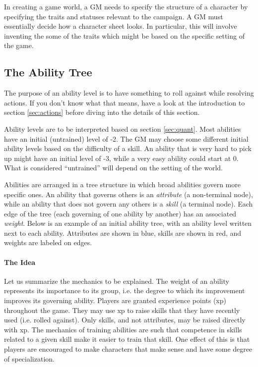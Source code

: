 \documentclass[12pt]{article}
\begin{document}
In creating a game world, a GM needs to specify the structure of a character by specifying the traits and statuses relevant to the campaign.
A GM must essentially decide how a character sheet looks.
In particular, this will involve inventing the some of the traits which might be based on the specific setting of the game.

\subsection{The Ability Tree}\label{sec:tree}			

The purpose of an ability level is to have something to roll against while resolving actions. If you don't know what that means, have a look at the introduction to section \ref{sec:actions} before diving into the details of this section.

Ability levels are to be interpreted based on section \ref{sec:quant}.
Most abilities have an initial (untrained) level of -2. The GM may choose some different initial ability levels based on the difficulty of a skill. An ability that is very hard to pick up might have an initial level of -3, while a very easy ability could start at 0. What is considered ``untrained'' will depend on the setting of the world.

Abilities are arranged in a tree structure in which broad abilities govern more specific ones.
An ability that governs others is an \emph{attribute} (a non-terminal node), while an ability that does not govern any others is a \emph{skill} (a terminal node).
Each edge of the tree (each governing of one ability by another) has an associated \emph{weight}.
Below is an example of an initial ability tree, with an ability level written next to each ability.
Attributes are shown in blue, skills are shown in red, and weights are labeled on edges.

\begin{center}

\end{center}

\paragraph{The Idea} Let us summarize the mechanics to be explained. The weight of an ability represents its importance to its group, i.e. the degree to which its improvement improves its governing ability.
Players are granted experience points (xp) throughout the game. They may use xp to raise skills that they have recently used (i.e. rolled against).
Only skills, and not attributes, may be raised directly with xp.
The mechanics of training abilities are such that competence in skills related to a given skill make it easier to train that skill.
One effect of this is that players are encouraged
to make characters that make sense and have some degree of specialization.
\end{document}
